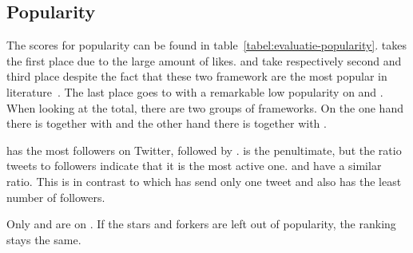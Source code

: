 \documentclass[a4paper]{artikel3}
\begin{document}
\subsection{Popularity} %
\label{sec:evaluation-popularity}



The scores for popularity can be found in table~\ref{tabel:evaluatie-popularity}. 
\kendo{} takes the first place due to the large amount of \fb{} likes.
\jqm{} and \st{} take respectively second and third place despite the fact that these two framework are the most popular in literature~\cite{David2011,Firtman2013,Hales2012,Oeflman2011}. 
The last place goes to \lungo{} with a remarkable low popularity on \so{} and \fb.
When looking at the total, there are two groups of frameworks.
On the one hand there is \kendo{} together with \jqm{} and the other hand there is \st{} together with \lungo{}.

\jqm{} has the most followers on Twitter, followed by \kendo.
\lungo{} is the penultimate, but the ratio tweets to followers indicate that it is the most active one. 
\jqm{} and \kendo{} have a similar ratio.
This is in contrast to \st{} which has send only one tweet and also has the least number of followers. 

Only \jqm{} and \lungo{} are on \gh{}. 
If the \gh{} stars and \gh{} forkers are left out of popularity, the ranking stays the same.
\end{document}
